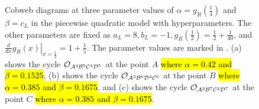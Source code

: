 \begin{figure}
	\centering
	\caption[Cobweb diagrams of the first piecewise quadratic model with compound parameters]{
	Cobweb diagrams at three parameter values of $\alpha = g_R\left(\frac{1}{4}\right)$ and $\beta = c_L$ in the piecewise quadratic model with hyperparameters.
	The other parameters are fixed as $a_L = 8, b_L = -1, g_R\left(\frac{1}{2}\right) = \frac{1}{2} + \frac{1}{40}$, and $\left. \frac{d}{dx} g_R(x) \right|_{x = \frac{1}{2}} = 1 + \frac{1}{5}$.
	The parameter values are marked in .
	(a) shows the cycle $\mathcal{O}_{\mathcal{A}^4\mathcal{B}^5\mathcal{C}^4\mathcal{D}^5}$ at the point $A$ \hl{where $\alpha = 0.42$ and $\beta = 0.1525$},
	(b) shows the cycle $\mathcal{O}_{\mathcal{A}^3\mathcal{B}^6\mathcal{D}^3\mathcal{C}^6}$ at the point $B$ \hl{where $\alpha = 0.385$ and $\beta = 0.1675$},
	and (c) shows the cycle $\mathcal{O}_{\mathcal{A}^2\mathcal{B}^7\mathcal{C}^2\mathcal{D}^7}$ at the point $C$ \hl{where $\alpha = 0.385$ and $\beta = 0.1675$}.
	}
	\label{fig:setup.quad.hyper.1.cobwebs}
\end{figure}

